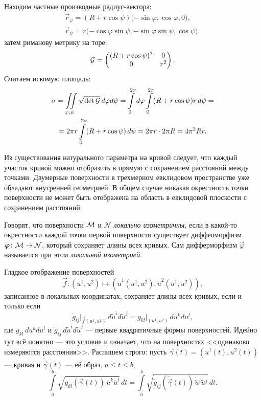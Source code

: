 \begin{solution}
	Находим частные производные радиус-вектора:
	\begin{gather*}
		\vec{r}_\varphi = (R + r\cos\psi)\big({-\sin\varphi}, \cos\varphi, 0\big),\\
		\vec{r}_\psi = r\big({-\cos\varphi\sin\psi}, -\sin\varphi\sin\psi, \cos\psi\big),
	\end{gather*}
	затем риманову метрику на торе:
	\[
		\mathcal{G} =
		\begin{pmatrix}
			(R + r\cos\psi)^2 & 0\\
			0 & r^2
		\end{pmatrix}.
	\]
	Считаем искомую площадь:
	\begin{multline*}
		\sigma = \iint\limits_{\varphi, \psi}\sqrt{\det\mathcal{G}}\,d\varphi d\psi = \int\limits_0^{2\pi}d\varphi\int\limits_0^{2\pi}(R + r\cos\psi)r\,d\psi =\\ = 2\pi r\int\limits_0^{2\pi}(R + r\cos\psi)\,d\psi = 2\pi r \cdot 2\pi R = 4\pi^2 Rr.
	\end{multline*}
\end{solution}

Из существования натурального параметра на кривой следует, что каждый участок кривой можно отобразить в прямую с сохранением расстояний между точками. Двумерные поверхности в трехмерном евклидовом пространстве уже обладают внутренней геометрией. В общем случае никакая окрестность точки поверхности не может быть отображена на область в евклидовой плоскости с сохранением расстояний.

\begin{definition}
	Говорят, что поверхности $\mathcal{M}$ и $\mathcal{N}$ \textit{локально изометричны}, если в какой-то окрестности каждой точки первой поверхности существует диффеоморфизм $\boldsymbol{\varphi}\colon \mathcal{M} \to \mathcal{N}$, который сохраняет длины всех кривых. Сам дифферморфизм $\vec{\varphi}$ называется при этом \textit{локальной изометрией}.
\end{definition}

\noindent
Гладкое отображение поверхностей
\[
	\vec{f}\colon (u^1, u^2) \mapsto (\widetilde{u}^1(u^1, u^2), \widetilde{u}^2(u^1, u^2)),
\]
записанное в локальных координатах, сохраняет длины всех кривых, если и только если
\begin{equation} \label{eq:Isometry}
	\widetilde{g}_{ij}\big|_{\vec{f}(u^1, u^2)}\,d\widetilde{u}^id\widetilde{u}^j = g_{kl}\big|_{(u^1, u^2)}\,du^kdu^l,
\end{equation}
где $g_{kl}\,du^kdu^l$ и $\widetilde{g}_{ij}\,d\widetilde{u}^id\widetilde{u}^j$ --- первые квадратичные формы поверхностей. Идейно тут всё понятно --- это условие и означает, что на поверхностях <<одинаково измеряются расстояния>>. Распишем строго: пусть $\vec{\gamma}(t) = (u^1(t), u^2(t))$ --- кривая и $\widetilde{\vec{\gamma}}(t)$ --- её образ, $a \leqslant t \leqslant b$,
\[
	\int\limits_a^b\sqrt{g_{kl}(\vec{\gamma}(t))\,\dot{u}^k\dot{u}^l}\,dt = \int\limits_a^b\sqrt{\widetilde{g}_{ij}(\widetilde{\vec{\gamma}}(t))\,\dot{\widetilde{u}}{}^i\dot{\widetilde{u}}{}^j}\,dt.
\]

